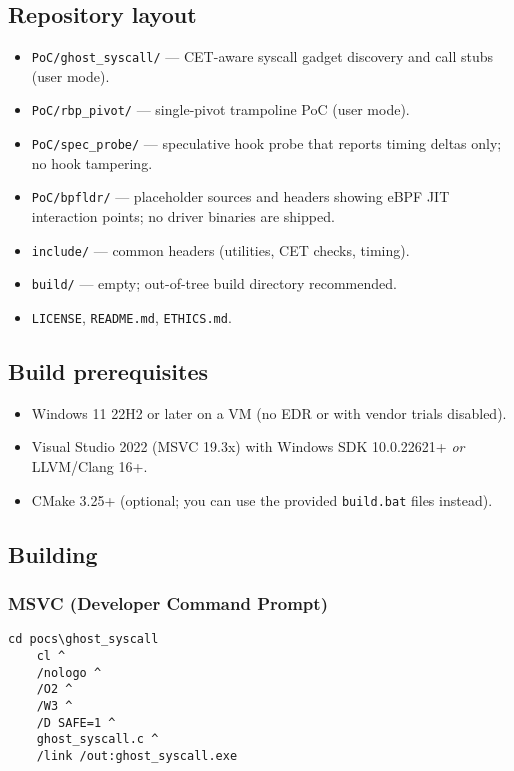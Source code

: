 \documentclass[11pt,letterpaper]{article}
\begin{document}
    \subsection{Repository layout}
    \begin{itemize}
    \item \texttt{PoC/ghost\_syscall/} — CET-aware syscall gadget discovery and call stubs (user mode).
    \item \texttt{PoC/rbp\_pivot/} — single-pivot trampoline PoC (user mode).
    \item \texttt{PoC/spec\_probe/} — speculative hook probe that reports timing deltas only; no hook tampering.
    \item \texttt{PoC/bpfldr/} — placeholder sources and headers showing eBPF JIT interaction points; no driver binaries are shipped.
    \item \texttt{include/} — common headers (utilities, CET checks, timing).
    \item \texttt{build/} — empty; out-of-tree build directory recommended.
    \item \texttt{LICENSE}, \texttt{README.md}, \texttt{ETHICS.md}.
    \end{itemize}

    \subsection{Build prerequisites}
    \begin{itemize}
    \item Windows 11 22H2 or later on a VM (no EDR or with vendor trials disabled).
    \item Visual Studio 2022 (MSVC 19.3x) with Windows SDK 10.0.22621+ \emph{or} LLVM/Clang 16+.
    \item CMake 3.25+ (optional; you can use the provided \texttt{build.bat} files instead).
    \end{itemize}

    \subsection{Building}
    \vspace{3em} 

    \subsubsection*{MSVC (Developer Command Prompt)}

    \begin{lstlisting}[style=cmd]
    cd pocs\ghost_syscall
    cl ^
    /nologo ^
    /O2 ^
    /W3 ^
    /D SAFE=1 ^
    ghost_syscall.c ^
    /link /out:ghost_syscall.exe
    \end{lstlisting}
\end{document}

